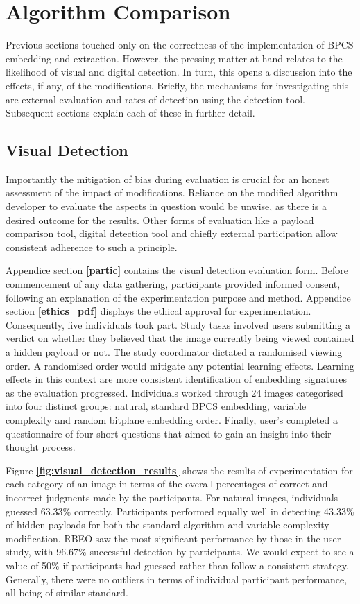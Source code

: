 \documentclass{l4proj}
\begin{document}
\section{Algorithm Comparison}

Previous sections touched only on the correctness of the implementation of BPCS embedding and extraction. However, the pressing matter at hand relates to the likelihood of visual and digital detection. In turn, this opens a discussion into the effects, if any, of the modifications. Briefly, the mechanisms for investigating this are external evaluation and rates of detection using the detection tool. Subsequent sections explain each of these in further detail.

\subsection{Visual Detection}

Importantly the mitigation of bias during evaluation is crucial for an honest assessment of the impact of modifications. Reliance on the modified algorithm developer to evaluate the aspects in question would be unwise, as there is a desired outcome for the results. Other forms of evaluation like a payload comparison tool, digital detection tool and chiefly external participation allow consistent adherence to such a principle.

Appendice section \textbf{\ref{partic}} contains the visual detection evaluation form. Before commencement of any data gathering, participants provided informed consent, following an explanation of the experimentation purpose and method. Appendice section \textbf{\ref{ethics_pdf}} displays the ethical approval for experimentation. Consequently, five individuals took part. Study tasks involved users submitting a verdict on whether they believed that the image currently being viewed contained a hidden payload or not. The study coordinator dictated a randomised viewing order. A randomised order would mitigate any potential learning effects. Learning effects in this context are more consistent identification of embedding signatures as the evaluation progressed. Individuals worked through 24 images categorised into four distinct groups: natural, standard BPCS embedding, variable complexity and random bitplane embedding order. Finally, user's completed a questionnaire of four short questions that aimed to gain an insight into their thought process. 

Figure \textbf{\ref{fig:visual_detection_results}} shows the results of experimentation for each category of an image in terms of the overall percentages of correct and incorrect judgments made by the participants. For natural images, individuals guessed 63.33\% correctly. Participants performed equally well in detecting 43.33\% of hidden payloads for both the standard algorithm and variable complexity modification. RBEO saw the most significant performance by those in the user study, with 96.67\% successful detection by participants. We would expect to see a value of 50\% if participants had guessed rather than follow a consistent strategy. Generally, there were no outliers in terms of individual participant performance, all being of similar standard. 
\end{document}
